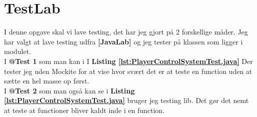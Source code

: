 \section{TestLab}
I denne opgave skal vi lave testing, det har jeg gjort på 2 forskellige måder.
Jeg har valgt at lave testing udfra \textbf{[JavaLab]} og jeg tester på klassen
 som ligger i  modulet. \\

I \textbf{@Test 1}  som man kan i I \textbf{Listing
\ref{lst:PlayerControlSystemTest.java}} Der tester jeg uden Mockite for at vise
hvor svært det er at teste en function uden at sætte en hel masse op først.  \\
I \textbf{@Test 2} som man også kan se i \textbf{Listing
\ref{lst:PlayerControlSystemTest.java}} bruger jeg  testing lib.
Det gør det nemt at teste at functioner bliver kaldt inde i en function.


